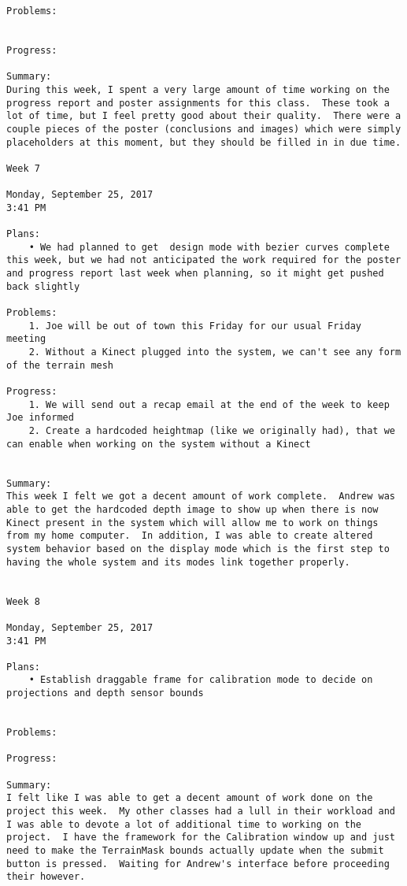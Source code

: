 \begin{lstlisting}
Problems:
	

Progress:

Summary:
During this week, I spent a very large amount of time working on the progress report and poster assignments for this class.  These took a lot of time, but I feel pretty good about their quality.  There were a couple pieces of the poster (conclusions and images) which were simply placeholders at this moment, but they should be filled in in due time.

Week 7

Monday, September 25, 2017
3:41 PM

Plans:
	• We had planned to get  design mode with bezier curves complete this week, but we had not anticipated the work required for the poster and progress report last week when planning, so it might get pushed back slightly

Problems:
	1. Joe will be out of town this Friday for our usual Friday meeting
	2. Without a Kinect plugged into the system, we can't see any form of the terrain mesh

Progress:
	1. We will send out a recap email at the end of the week to keep Joe informed
	2. Create a hardcoded heightmap (like we originally had), that we can enable when working on the system without a Kinect
	

Summary:
This week I felt we got a decent amount of work complete.  Andrew was able to get the hardcoded depth image to show up when there is now Kinect present in the system which will allow me to work on things from my home computer.  In addition, I was able to create altered system behavior based on the display mode which is the first step to having the whole system and its modes link together properly.


Week 8

Monday, September 25, 2017
3:41 PM

Plans:
	• Establish draggable frame for calibration mode to decide on projections and depth sensor bounds
	

Problems:

Progress:

Summary:
I felt like I was able to get a decent amount of work done on the project this week.  My other classes had a lull in their workload and I was able to devote a lot of additional time to working on the project.  I have the framework for the Calibration window up and just need to make the TerrainMask bounds actually update when the submit button is pressed.  Waiting for Andrew's interface before proceeding their however.


\end{lstlisting}
